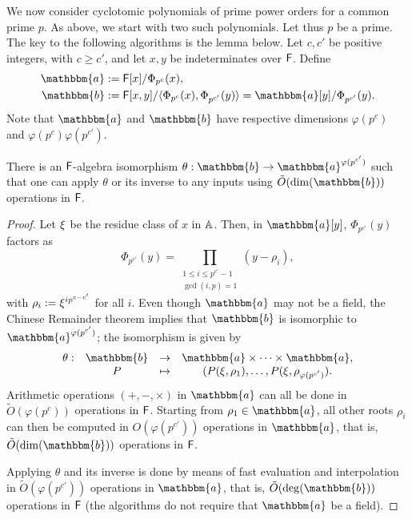 We now consider cyclotomic polynomials of prime power
orders for a common prime $p$. As above, we start with two such polynomials.
Let thus $p$ be a prime. The key to the following algorithms is the
lemma below.  Let $c,c'$ be positive integers, with $c \ge
c'$, and let $x,y$ be indeterminates over ${\mathsf{F}}$. Define
\begin{align}
\mathbbm{a}&:=\F[x]/\Phi_{p^c}(x),  \\
\mathbbm{b}&:=\F[x,y]/\langle \Phi_{p^c}(x), \Phi_{p^{c'}}(y)\rangle = \mathbbm{a}[y]/\Phi_{p^{c'}}(y).
\end{align}
Note that $\mathbbm{a}$ and $\mathbbm{b}$ have respective dimensions
$\varphi(p^c)$ and $\varphi(p^c) \varphi(p^{c'})$.
\begin{lemma}
  There is an ${\mathsf{F}}$-algebra isomorphism $\theta: \mathbbm{b} \to
  \mathbbm{a}^{\varphi(p^{c'})}$ such that one can apply $\theta$ or
  its inverse to any inputs using $\tilde{O}(\dim(\mathbbm{b}))$ operations in ${\mathsf{F}}$.
\end{lemma}
\begin{proof}
  Let $\xi$ be the residue class of
  $x$ in $\mathbb{A}$. Then, in $\mathbbm{a}[y]$, $\Phi_{p^{c'}}(y)$ factors as
  $$\Phi_{p^{c'}}(y) =\prod_{\substack{1 \le i\le p^{c'}-1\\ \gcd(i,p)
      =1}} (y-\rho_i),$$ with $\rho_i:={\xi}^{i p^{c-c'}}$ for all
  $i$.  Even though $\mathbbm{a}$ may not be a field, the Chinese
  Remainder theorem implies that $\mathbbm{b}$ is isomorphic to
  $\mathbbm{a}^{\varphi(p^{c'})}$; the isomorphism is given by
  $$\begin{array}{cccc}
    \theta: & \mathbbm{b} & \to & \mathbbm{a} \times \cdots \times \mathbbm{a}, \\
    & P & \mapsto& (P(\xbar,\rho_1),\dots,P(\xbar,\rho_{\varphi(p^{c'})}).
  \end{array}$$
  Arithmetic operations $(+,-,\times)$ in
  $\mathbbm{a}$ can all be done in $\tilde{O}(\varphi(p^c))$ operations
  in ${\mathsf{F}}$. Starting from $\rho_1 \in \mathbbm{a}$, all other roots
  $\rho_i$ can then be computed in $O(\varphi(p^{c'}))$ operations in
  $\mathbbm{a}$, that is, $\tilde{O}(\dim(\mathbbm{b}))$
  operations in ${\mathsf{F}}$. 
  
Applying $\theta$ and its inverse is done by means of fast evaluation
and interpolation~\cite[Chapter~10]{vzGathen13} in $\tilde{O}(\varphi(p^{c'}))$
operations in $\mathbbm{a}$, that is, $\tilde{O}(\deg(\mathbbm{b}))$ operations in ${\mathsf{F}}$
(the algorithms do not require that $\mathbbm{a}$ be a field).
\end{proof}

